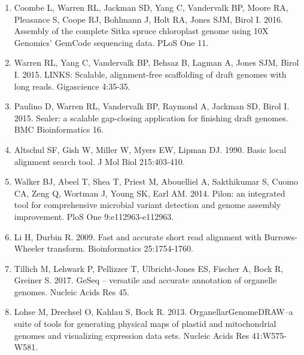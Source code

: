 \documentclass[titlepage,11pt, oneside]{article}   	%
\begin{document}
\begin{enumerate}
\item Coombe L, Warren RL, Jackman SD, Yang C, Vandervalk BP, Moore RA, Pleasance S, Coope RJ, Bohlmann J, Holt RA, Jones SJM, Birol I. 2016. Assembly of the complete Sitka spruce chloroplast genome using 10X Genomics’ GemCode sequencing data. PLoS One 11.
\item Warren RL, Yang C, Vandervalk BP, Behsaz B, Lagman A, Jones SJM, Birol I. 2015. LINKS: Scalable, alignment-free scaffolding of draft genomes with long reads. Gigascience 4:35-35.
\item Paulino D, Warren RL, Vandervalk BP, Raymond A, Jackman SD, Birol I. 2015. Sealer: a scalable gap-closing application for finishing draft genomes. BMC Bioinformatics 16.
\item Altschul SF, Gish W, Miller W, Myers EW, Lipman DJ. 1990. Basic local alignment search tool. J Mol Biol 215:403-410.
\item Walker BJ, Abeel T, Shea T, Priest M, Abouelliel A, Sakthikumar S, Cuomo CA, Zeng Q, Wortman J, Young SK, Earl AM. 2014. Pilon: an integrated tool for comprehensive microbial variant detection and genome assembly improvement. PloS One 9:e112963-e112963.
\item Li H, Durbin R. 2009. Fast and accurate short read alignment with Burrows-Wheeler transform. Bioinformatics 25:1754-1760.
\item Tillich M, Lehwark P, Pellizzer T, Ulbricht-Jones ES, Fischer A, Bock R, Greiner S. 2017. GeSeq – versatile and accurate annotation of organelle genomes. Nucleic Acids Res 45.
\item Lohse M, Drechsel O, Kahlau S, Bock R. 2013. OrganellarGenomeDRAW--a suite of tools for generating physical maps of plastid and mitochondrial genomes and visualizing expression data sets. Nucleic Acids Res 41:W575-W581.
\end{enumerate}
\end{document}
